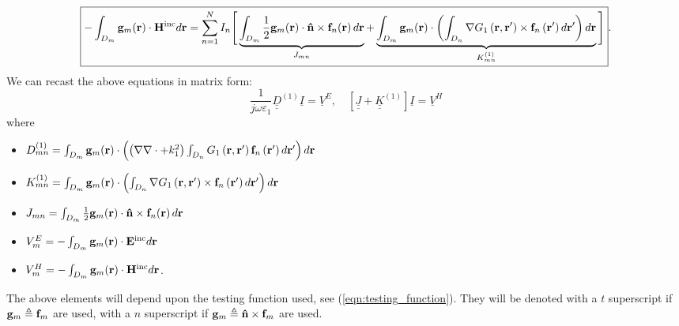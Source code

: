 \begin{equation}\label{eqn:MFIE-O_PEC_2}
\boxed{-\int_{D_m}\mathbf{g}_m \!\left(\mathbf{r}\right) \cdot \mathbf{H}^\text{inc} d\mathbf{r} = \sum_{n=1}^{N} I_n \Bigg[\underbrace{\int_{D_m} \frac{1}{2} \mathbf{g}_m \!\left(\mathbf{r}\right) \cdot \mathbf{\hat{n}} \times \mathbf{f}_{n}\!\left(\mathbf{r}\right)d\mathbf{r} }_{J_{mn}}+ \underbrace{\int_{D_m} \mathbf{g}_m \!\left(\mathbf{r}\right) \cdot \left(\int_{D_n} \nabla G_1\left(\mathbf{r}, \mathbf{r}'\right) \times \mathbf{f}_n\left(\mathbf{r}'\right) d\mathbf{r}'\right) d\mathbf{r}}_{K_{mn}^{(1)}} \Bigg]}.
\end{equation}
We can recast the above equations in matrix form:
\begin{equation}
\frac{1}{j \omega \varepsilon_1} \underline{\underline{D}}^{(1)} \underline{I} = \underline{V}^{E}, \quad \left[\underline{\underline{J}} + \underline{\underline{K}}^{(1)} \right] \underline{I} = \underline{V}^{H}
\end{equation}
where
\begin{itemize}
\item $D_{mn}^{(1)} = \int_{D_m}\mathbf{g}_m \!\left(\mathbf{r}\right) \cdot \left( \left(\nabla \nabla \cdot + k_1^2\right) \int_{D_n} G_1\left(\mathbf{r}, \mathbf{r}'\right) \mathbf{f}_n\left(\mathbf{r}'\right) d\mathbf{r}' \right) d\mathbf{r}$
\item $K_{mn}^{(1)} = \int_{D_m} \mathbf{g}_m \!\left(\mathbf{r}\right) \cdot \left(\int_{D_n} \nabla G_1\left(\mathbf{r}, \mathbf{r}'\right) \times \mathbf{f}_n\left(\mathbf{r}'\right) d\mathbf{r}'\right) d\mathbf{r}$
\item $J_{mn} = \int_{D_m} \frac{1}{2} \mathbf{g}_m \!\left(\mathbf{r}\right) \cdot \mathbf{\hat{n}} \times \mathbf{f}_{n}\!\left(\mathbf{r}\right)d\mathbf{r}$
\item $V_m^{E} = -\int_{D_m}\mathbf{g}_m \!\left(\mathbf{r}\right) \cdot \mathbf{E}^\text{inc} d\mathbf{r}$
\item $V_m^{H} = -\int_{D_m}\mathbf{g}_m \!\left(\mathbf{r}\right) \cdot \mathbf{H}^\text{inc} d\mathbf{r}$.
\end{itemize}
%
\par
The above elements will depend upon the testing function used, see (\ref{eqn:testing_function}). They will be denoted with a $t$ superscript if $\mathbf{g}_m \triangleq \mathbf{f}_m$ are used, with a $n$ superscript if $\mathbf{g}_m \triangleq \mathbf{\Hat{n}} \times \mathbf{f}_m$ are used.

